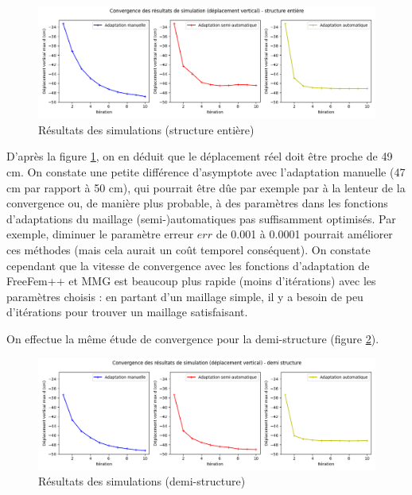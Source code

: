     \begin{figure}        
        \begin{center}
        
            \includegraphics[width=16.5cm]{imgs/cvg.png}
            \caption{Résultats des simulations (structure entière)}
            \label{fig:cvg}
        
        \end{center}
    \end{figure}

    D'après la figure \ref{fig:cvg}, on en déduit que le déplacement réel doit être proche de 49 cm. On constate une petite différence d'asymptote avec l'adaptation manuelle (47 cm par rapport à 50 cm),
    qui pourrait être dûe par exemple par à la lenteur de la convergence ou, de manière plus probable, à des paramètres dans les fonctions d'adaptations du maillage
    (semi-)automatiques pas suffisamment optimisés. Par exemple, diminuer le paramètre erreur $err$ de 0.001 à 0.0001 pourrait améliorer ces méthodes (mais cela aurait un
    coût temporel conséquent). On constate cependant que la vitesse de convergence avec les fonctions d'adaptation de FreeFem++
    et MMG est beaucoup plus rapide (moins d'itérations) avec les paramètres choisis : en partant d'un maillage simple, il y a besoin de peu d'itérations pour trouver un maillage satisfaisant.

    On effectue la même étude de convergence pour la demi-structure (figure \ref{fig:h_cvg}).

    \begin{figure}        
        \begin{center}
        
            \includegraphics[width=16.5cm]{imgs/cvgH.png}
            \caption{Résultats des simulations (demi-structure)}
            \label{fig:h_cvg}
        
        \end{center}
    \end{figure}

